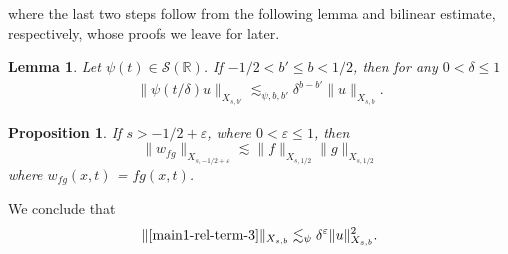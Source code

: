 \documentclass[12pt,reqno]{amsart}
\numberwithin{equation}{section}  %
\renewcommand{\cref}{\Cref}
\newcommand{\rr}{\mathbb{R}}
\newcommand{\ee}{\varepsilon}
\newtheorem{lemma}[theorem]{Lemma}
\newtheorem{proposition}[theorem]{Proposition}
\begin{document}
%
%
%
where the last two steps follow from the following lemma and bilinear estimate, respectively, whose proofs we leave for later.
\begin{lemma}
  Let $\psi(t) \in \mathcal{S}(\rr)$. If $-1/2 < b' \le b < 1/2$, then for any
  $0 < \delta \le 1$
  \begin{equation*}
  \begin{split}
    \| \psi(t/\delta) u \|_{X_{s,b'}} \lesssim_{\psi, b, b'} \delta^{b - b'} \| u
    \|_{X_{s,b}}.
  \end{split}
  \end{equation*}
\label{lem:time-local-est}
\end{lemma}
%
%
%
%
%
%
%
%
\begin{proposition}
\label{prop:bilinear-est}
	If $s > -1/2 + \ee$, where $0 < \ee \le 1$, then
	\begin{equation}
	  \| w_{fg} \|_{X_{s,-1/2 + \ee}}
		    \lesssim \|f\|_{X_{s,1/2}} \|g\|_{X_{s,1/2}}
	\end{equation}
  where $w_{fg}(x,t)$ = $fg (x,t)$.
%
%
%
%
\end{proposition}
%
%
We conclude that 
\begin{equation}
	\begin{split}
    \|\cref{main1-rel-term-3}\|_{X_{s,b}} \lesssim_{\psi} \delta^{\ee} 
    \|u\|^{2}_{X_{s,b}}.
	\end{split}
\end{equation}
%
%
%
%
%
\end{document}
